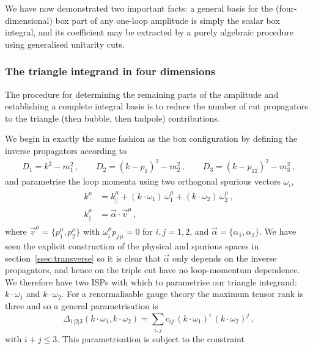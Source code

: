 We have now demonstrated two important facts: a general basis for the
(four-dimensional) box part of any one-loop amplitude is simply the scalar box
integral, and its coefficient may be extracted by a purely algebraic
procedure using generalised unitarity cuts.

\subsubsection{The triangle integrand in four dimensions}

The procedure for determining the remaining parts of the amplitude and
establishing a complete integral basis is to reduce the number of cut
propagators to the triangle (then bubble, then tadpole) contributions.

We begin in exactly the same fashion as the box configuration by defining the inverse propagators according to
\begin{align}  \label{eq:triprops}
D_1 = k^2-m_1^2 \,, \qquad
D_2 = (k-p_1)^2 - m_2^2 \,, \qquad
D_3 = (k-p_{12})^2 - m_3^2 \,,
\end{align}
and parametrise the loop momenta using two orthogonal spurious vectors $\omega_i$,
\begin{align} 
\begin{aligned}
  k^\mu &= k_{\parallel}^\mu + (k\cdot\omega_1) \, \omega_1^{\mu} + (k\cdot\omega_2) \, \omega_2^{\mu} \,, \\
  k_{\parallel}^\mu &= \vec{\alpha}\cdot \vec{v}^\mu \,,
\end{aligned}
  \label{eq:momparamtri}
\end{align}
where $\vec{v}^{\mu} = \{p_1^{\mu},p_2^{\mu}\}$ with $\omega_i^{\mu} p_{j\, \mu} = 0$ for $i,j=1,2$, and $\vec{\alpha} =
\{\alpha_1, \alpha_2\}$. We have seen the explicit construction of the physical
and spurious spaces in section~\ref{ssec:transverse} so it is clear that
$\vec{\alpha}$ only depends on the inverse propagators, and hence on the triple cut
have no loop-momentum dependence. We therefore have two ISPs with which to
parametrise our triangle integrand: $k\cdot\omega_1$ and $k\cdot\omega_2$. For a
renormalisable gauge theory the maximum tensor rank is three and so a general
parametrisation is
\begin{equation}
  \Delta_{1|2|3}(k\cdot\omega_1, k\cdot\omega_2) = \sum_{i,j} c_{ij}  \,(k\cdot\omega_1)^i \, (k\cdot\omega_2)^j \,,
  \label{eq:triparam1}
\end{equation}
with $i+j \leq3$. This parametrisation is subject to the constraint
